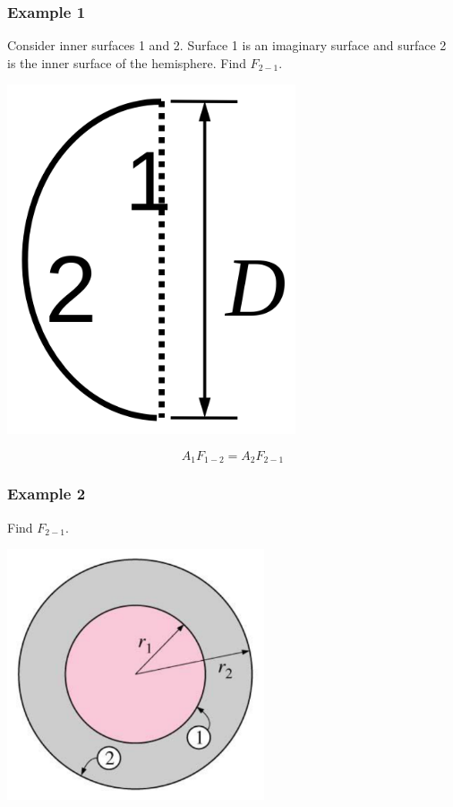 \documentclass[11pt]{article}
\begin{document}
\subsubsection{Example 1}
\label{sec:org7703221}
Consider inner surfaces 1 and 2. Surface 1 is an imaginary surface and surface 2 is the inner surface of the hemisphere. Find \(F_{2-1}\).
\begin{center}
\includegraphics[width=.9\linewidth]{./images/reciprocity-relation-example-1-diagram.png}
\end{center}
\[A_1 F_{1-2} = A_2 F_{2-1}\]

 \newpage
\subsubsection{Example 2}
\label{sec:org4655fb7}
Find \(F_{2-1}\).
\begin{center}
\includegraphics[height=20em]{./images/sphere-enclosed-within-another-sphere-diagram.png}
\end{center}
\end{document}
